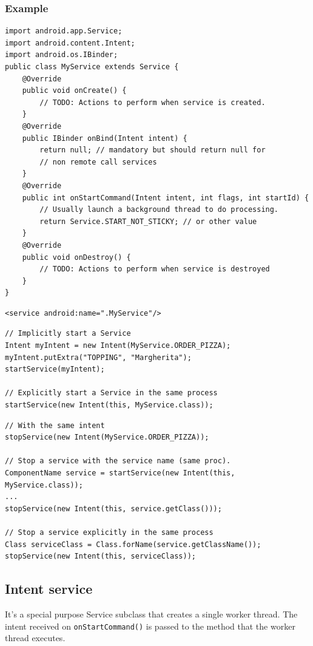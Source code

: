 \subsubsection{Example}

\begin{lstlisting}[title=Service code template]
import android.app.Service;
import android.content.Intent;
import android.os.IBinder;
public class MyService extends Service {
    @Override
    public void onCreate() {
        // TODO: Actions to perform when service is created.
    }
    @Override
    public IBinder onBind(Intent intent) {
        return null; // mandatory but should return null for
        // non remote call services
    }
    @Override
    public int onStartCommand(Intent intent, int flags, int startId) {
        // Usually launch a background thread to do processing.
        return Service.START_NOT_STICKY; // or other value
    }
    @Override
    public void onDestroy() {
        // TODO: Actions to perform when service is destroyed
    }
}
\end{lstlisting}

\begin{lstlisting}[title=Manifest]
    <service android:name=".MyService"/>
\end{lstlisting}

\begin{lstlisting}[title=Calling the service]
// Implicitly start a Service
Intent myIntent = new Intent(MyService.ORDER_PIZZA);
myIntent.putExtra("TOPPING", "Margherita");
startService(myIntent);

// Explicitly start a Service in the same process
startService(new Intent(this, MyService.class));
\end{lstlisting}

\begin{lstlisting}[title=Stoping the service]
// With the same intent
stopService(new Intent(MyService.ORDER_PIZZA));

// Stop a service with the service name (same proc).
ComponentName service = startService(new Intent(this, MyService.class));
...
stopService(new Intent(this, service.getClass()));

// Stop a service explicitly in the same process
Class serviceClass = Class.forName(service.getClassName());
stopService(new Intent(this, serviceClass));
\end{lstlisting}


\subsection{Intent service}
It's a special purpose Service subclass that creates a single worker thread.
The intent received on \texttt{onStartCommand()} is passed to the method that 
the worker thread executes.

